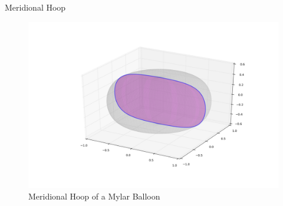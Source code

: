 \documentclass{beamer}
\begin{document}
\begin{frame}{Meridional Hoop}

  \begin{figure}[!ht]
    \centering
    \includegraphics[width=1\textwidth]{mylar_balloon_meridianal_hoop.png}
    \caption{Meridional Hoop of a Mylar Balloon }
  \end{figure}

\end{frame}
\end{document}
